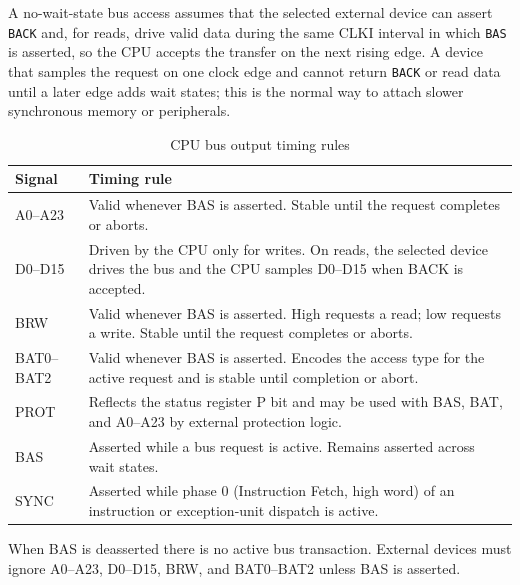 A no-wait-state bus access assumes that the selected external device can assert \texttt{BACK} and, for reads, drive
valid data during the same CLKI interval in which \texttt{BAS} is asserted, so the CPU accepts the transfer on the next
rising edge. A device that samples the request on one clock edge and cannot return \texttt{BACK} or read data until a
later edge adds wait states; this is the normal way to attach slower synchronous memory or peripherals.

\begin{table}[H]
	\centering
	\small
	\begin{tabularx}{\textwidth}{lX}
		\toprule
		\textbf{Signal} & \textbf{Timing rule}                                                                                                               \\
		\midrule
		A0--A23         & Valid whenever BAS is asserted. Stable until the request completes or aborts.                                                      \\
		D0--D15         & Driven by the CPU only for writes. On reads, the selected device drives the bus and the CPU samples D0--D15 when BACK is accepted. \\
		BRW             & Valid whenever BAS is asserted. High requests a read; low requests a write. Stable until the request completes or aborts.          \\
		BAT0--BAT2      & Valid whenever BAS is asserted. Encodes the access type for the active request and is stable until completion or abort.            \\
		PROT            & Reflects the status register P bit and may be used with BAS, BAT, and A0--A23 by external protection logic.                        \\
		BAS             & Asserted while a bus request is active. Remains asserted across wait states.                                                       \\
		SYNC            & Asserted while phase 0 (Instruction Fetch, high word) of an instruction or exception-unit dispatch is active.                      \\
		\bottomrule
	\end{tabularx}
	\caption{CPU bus output timing rules}
	\label{tab:bus-output-timing-rules}
\end{table}

When BAS is deasserted there is no active bus transaction. External devices must ignore A0--A23, D0--D15, BRW, and
BAT0--BAT2 unless BAS is asserted.

